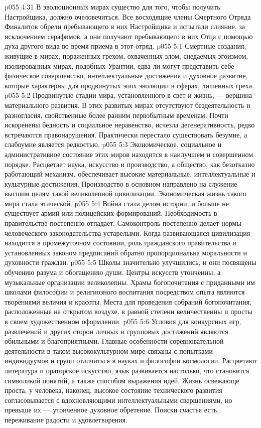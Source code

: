 \vs p055 4:31 В эволюционных мирах существо для того, чтобы получить Настройщика, должно очеловечиться. Все восходящие члены Смертного Отряда Финалитов обрели пребывающего в них Настройщика и испытали слияние, за исключением серафимов, а они получают пребывающего в них Отца с помощью духа другого вида во время приема в этот отряд.
\vs p055 5:1 Смертные создания, живущие в мирах, пораженных грехом, охваченных злом, снедаемых эгоизмом, изолированных мирах, подобных Урантии, едва ли могут представить себе физическое совершенство, интеллектуальные достижения и духовное развитие, которые характерны для продвинутых эпох эволюции в сферах, лишенных греха.
\vs p055 5:2 Продвинутые стадии мира, установленного в свет и жизнь, --- вершина материального развития. В этих развитых мирах отсутствуют бездеятельность и разногласия, свойственные более ранним первобытным временам. Почти искоренены бедность и социальное неравенство, исчезла дегенеративность, редко встречаются правонарушения. Практически перестало существовать безумие, а слабоумие является редкостью.
\vs p055 5:3 Экономическое, социальное и административное состояние этих миров находится в наилучшем и совершенном порядке. Расцветает наука, искусство и производство, а общество, как безотказно работающий механизм, обеспечивает высокие материальные, интеллектуальные и культурные достижения. Производство в основном направлено на служение высшим целям такой великолепной цивилизации. Экономическая жизнь такого мира стала этической.
\vs p055 5:4 Война стала делом истории, и больше не существует армий или полицейских формирований. Необходимость в правительстве постепенно отпадает. Самоконтроль постепенно делает нормы человеческого законодательства устарелыми. Когда развивающаяся цивилизация находится в промежуточном состоянии, роль гражданского правительства и установленных законом предписаний обратно пропорциональна моральности и духовности граждан.
\vs p055 5:5 Школы значительно улучшились, и они посвящены обучению разума и обогащению души. Центры искусств утонченны, а музыкальные организации великолепны. Храмы богопочитания с приданными им школами философии и религиозного воспитания посредством опыта являются творениями величия и красоты. Места для проведения собраний богопочитания, расположенные на открытом воздухе, в равной степени величественны и просты в своем художественном оформлении.
\vs p055 5:6 Условия для конкурсных игр, развлечений и других сторон личных и групповых достижений являются обильными и благоприятными. Главные особенности соревновательной деятельности в таком высококультурном мире связаны с попытками индивидуумов и групп отличиться в науках и философии космологии. Расцветают литература и ораторское искусство, язык развивается настолько, что становится символикой понятий, а также способом выражения идей. Жизнь освежающе проста, у человека, наконец, высокое состояние технического развития согласовывается с вдохновляющими интеллектуальными свершениями, но превыше их --- утонченное духовное обретение. Поиски счастья есть переживание радости и удовлетворения.
